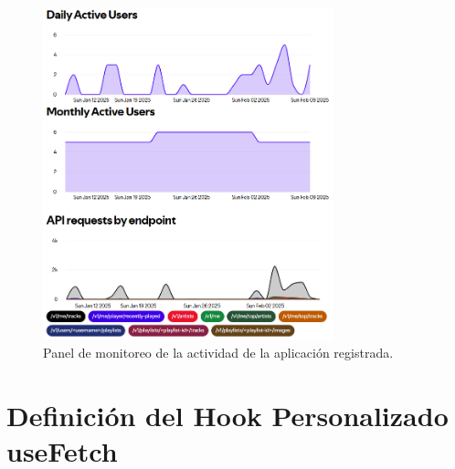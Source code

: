 \begin{figure}[H]
  \centering
  \includegraphics[width=0.75\textwidth]{figures/registro_spotify/dashboard_spotify.png}
  \caption{Panel de monitoreo de la actividad de la aplicación registrada.}
  \label{fig:dashboard_spotify}
\end{figure}

\section*{Definición del Hook Personalizado useFetch}


